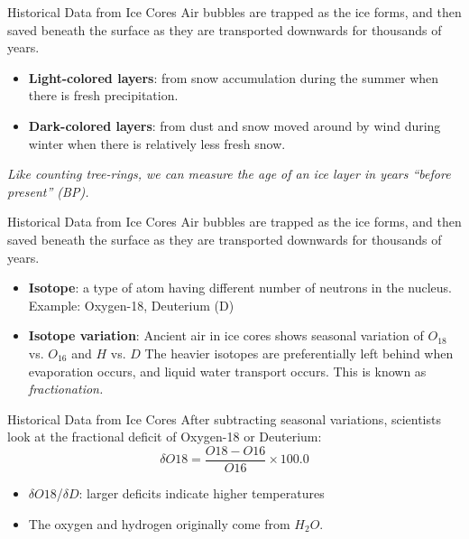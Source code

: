 \documentclass{beamer}
\begin{document}
\begin{frame}{Historical Data from Ice Cores}
Air bubbles are trapped as the ice forms, and then saved beneath the surface as they are transported downwards for thousands of years.
\begin{itemize}
\item \textbf{Light-colored layers}: from snow accumulation during the summer when there is fresh precipitation.
\item \textbf{Dark-colored layers}: from dust and snow moved around by wind during winter when there is relatively less fresh snow.
\end{itemize}
\textit{Like counting tree-rings, we can measure the age of an ice layer in years ``before present'' (BP).}
\end{frame}

\begin{frame}{Historical Data from Ice Cores}
Air bubbles are trapped as the ice forms, and then saved beneath the surface as they are transported downwards for thousands of years.
\begin{itemize}
\item \textbf{Isotope}: a type of atom having different number of neutrons in the nucleus.  Example: Oxygen-18, Deuterium (D)
\item \textbf{Isotope variation}: Ancient air in ice cores shows seasonal variation of $O_{18}$ vs. $O_{16}$ and $H$ vs. $D$  The heavier isotopes are preferentially left behind when evaporation occurs, and liquid water transport occurs.  This is known as \textit{fractionation.}
\end{itemize}
\end{frame}

\begin{frame}{Historical Data from Ice Cores}
After subtracting seasonal variations, scientists look at the fractional deficit of Oxygen-18 or Deuterium:
\begin{equation}
\delta O18 = \frac{O18-O16}{O16} \times 100.0
\end{equation}
\begin{itemize}
\item $\delta O18$/$\delta D$: larger deficits indicate higher temperatures
\item The oxygen and hydrogen originally come from $H_2 O$.
\end{itemize}
\end{frame}
\end{document}
